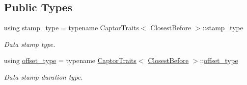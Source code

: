 \subsection*{Public Types}
\begin{DoxyCompactItemize}
\item 
\mbox{\label{classflow_1_1follower_1_1_closest_before_aa022f9ad90083d6ea754d5f800bfcd36}} 
using \hyperlink{classflow_1_1follower_1_1_closest_before_aa022f9ad90083d6ea754d5f800bfcd36}{stamp\+\_\+type} = typename \hyperlink{structflow_1_1_captor_traits}{Captor\+Traits}$<$ \hyperlink{classflow_1_1follower_1_1_closest_before}{Closest\+Before} $>$\+::\hyperlink{classflow_1_1follower_1_1_closest_before_aa022f9ad90083d6ea754d5f800bfcd36}{stamp\+\_\+type}
\begin{DoxyCompactList}\small\item\em Data stamp type. \end{DoxyCompactList}\item 
\mbox{\label{classflow_1_1follower_1_1_closest_before_aeb5bb0a977487c9e4df80143c6dcb008}} 
using \hyperlink{classflow_1_1follower_1_1_closest_before_aeb5bb0a977487c9e4df80143c6dcb008}{offset\+\_\+type} = typename \hyperlink{structflow_1_1_captor_traits}{Captor\+Traits}$<$ \hyperlink{classflow_1_1follower_1_1_closest_before}{Closest\+Before} $>$\+::\hyperlink{classflow_1_1follower_1_1_closest_before_aeb5bb0a977487c9e4df80143c6dcb008}{offset\+\_\+type}
\begin{DoxyCompactList}\small\item\em Data stamp duration type. \end{DoxyCompactList}\end{DoxyCompactItemize}
